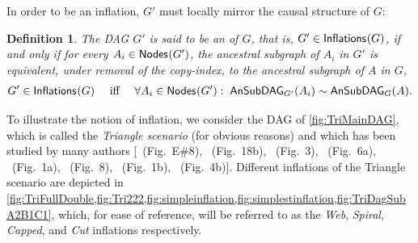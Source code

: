 \documentclass[aps,english,superscriptaddress,onecolumn,twoside,longbibliography,pra,floatfix,fleqn,nofootinbib]{revtex4-1}%
\newcommand*{\tblue}[1]{{\color{MidnightBlue}{\textbf{#1}}}}
\newtheorem{definition}[theorem]{Definition}
\theoremstyle{definition}
\newcommand{\SmallNamedFunction}[3][]{\operatorname{\mathsf{#2}}_{#1}\parenths{#3}}
\newcommand{\ansubgraph}[2][]{\SmallNamedFunction[#1]{AnSubDAG}{#2}}
\newcommand{\nodes}[1]{\SmallNamedFunction{Nodes}{#1}}
\newcommand{\inflations}[1]{\SmallNamedFunction{Inflations}{#1}}
\DeclarePairedDelimiter{\parenths}{\lparen}{\rparen}
\begin{document}
In order to be an inflation, $G'$ must locally mirror the causal structure of $G$:
\begin{definition}
	The DAG $G'$ is said to be an \tblue{inflation} of $G$, that is, $G' \in \inflations{G}$, if and only if for every $A_i\in\nodes{G'}$, the ancestral subgraph of $A_i$ in $G'$ is equivalent, under removal of the copy-index, to the ancestral subgraph of $A$ in $G$,
\begin{align}\label{eq:definflationDAG}
G' \in\inflations{G} \quad\text{ iff }\quad \forall A_i\in \nodes{G'}:\; \ansubgraph[G']{A_i}\sim\ansubgraph[G]{A}.
\end{align}
\end{definition}

To illustrate the notion of inflation, we consider the DAG of \cref{fig:TriMainDAG}, which is called the {\em Triangle scenario} (for obvious reasons) and which has been studied by many authors [\citealp{pusey2014gdag}~(Fig.~E\#8), \citealp{WoodSpekkens}~(Fig.~18b), \citealp{fritz2012bell}~(Fig.~3), \citealp{chaves2014novel}~(Fig.~6a), \citealp{Chaves2015infoquantum}~(Fig.~1a), \citealp{BilocalCorrelations}~(Fig.~8), \citealp{steudel2010ancestors}~(Fig.~1b), \citealp{chaves2014informationinference}~(Fig.~4b)].
Different inflations of the Triangle scenario are depicted in \cref{fig:TriFullDouble,fig:Tri222,fig:simpleinflation,fig:simplestinflation,fig:TriDagSubA2B1C1}, which, for ease of reference, will be referred to as the {\em Web}, {\em Spiral}, {\em Capped}, and {\em Cut} inflations respectively.
\end{document}
